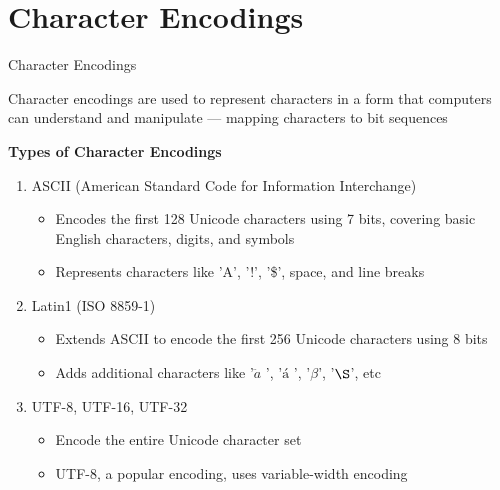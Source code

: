 \documentclass[
	11pt, 
]{beamer}
\begin{document}
\section{Character Encodings}
\begin{frame}{Character Encodings}

Character encodings are used to represent characters in a form that computers can understand and manipulate --- mapping characters to bit sequences

\begin{block}{\textbf{Types of Character Encodings}}
     \begin{enumerate}
         \item ASCII (American Standard Code for Information Interchange)
         \begin{itemize}
             \item Encodes the first 128 Unicode characters using 7 bits, covering basic English characters, digits, and symbols
             \item Represents characters like 'A', '!', '\$', space, and line breaks
         \end{itemize}
         \item Latin1 (ISO 8859-1)
         \begin{itemize}
             \item Extends ASCII to encode the first 256 Unicode characters using 8 bits
             \item Adds additional characters like '$\ddot{a}$ ', '$á$ ', '$\beta$', '$\S$', etc
        
         \end{itemize}
         \item UTF-8, UTF-16, UTF-32
         \begin{itemize}
             \item Encode the entire Unicode character set
             \item UTF-8, a popular encoding, uses variable-width encoding
         \end{itemize}
     \end{enumerate}
\end{block}
    
\end{frame}

\end{document}
